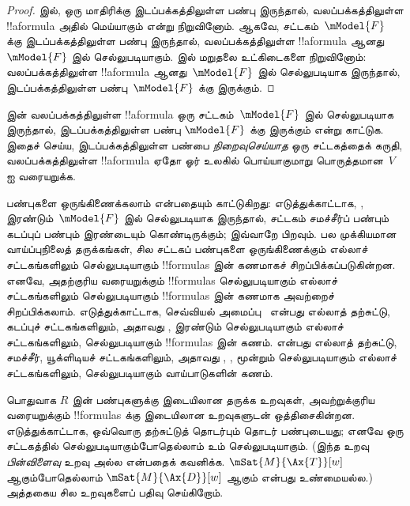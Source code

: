 \documentclass[../../../include/open-logic-section]{subfiles}
\begin{document}
\begin{proof}
   இல், ஒரு மாதிரிக்கு இடப்பக்கத்திலுள்ள பண்பு
  இருந்தால், வலப்பக்கத்திலுள்ள !!a{formula} அதில் மெய்யாகும் என்று
  நிறுவினோம். ஆகவே, சட்டகம்~$\mModel{F}$ க்கு இடப்பக்கத்திலுள்ள பண்பு
  இருந்தால், வலப்பக்கத்திலுள்ள !!a{formula} ஆனது~$\mModel{F}$ இல்
  செல்லுபடியாகும்.  இல் மறுதலை உட்கிடைகளை
  நிறுவினோம்: வலப்பக்கத்திலுள்ள !!a{formula} ஆனது~$\mModel{F}$ இல்
  செல்லுபடியாக இருந்தால், இடப்பக்கத்திலுள்ள பண்பு~$\mModel{F}$ க்கு இருக்கும்.
\end{proof}

\begin{prob}
 இன் வலப்பக்கத்திலுள்ள !!a{formula}
ஒரு சட்டகம்~$\mModel{F}$ இல் செல்லுபடியாக இருந்தால், இடப்பக்கத்திலுள்ள பண்பு
$\mModel{F}$ க்கு இருக்கும் என்று காட்டுக. இதைச் செய்ய, இடப்பக்கத்திலுள்ள
பண்பை \emph{நிறைவுசெய்யாத} ஒரு சட்டகத்தைக் கருதி, வலப்பக்கத்திலுள்ள
!!a{formula} ஏதோ ஓர் உலகில் பொய்யாகுமாறு பொருத்தமான~$V$ ஐ வரையறுக்க.
\end{prob}

பண்புகளை ஒருங்கிணைக்கலாம் என்பதையும் 
காட்டுகிறது: எடுத்துக்காட்டாக, ,  இரண்டும்~$\mModel{F}$ இல்
செல்லுபடியாக இருந்தால், சட்டகம் சமச்சீர்ப் பண்பும் கடப்புப் பண்பும் இரண்டையும்
கொண்டிருக்கும்; இவ்வாறே பிறவும். பல முக்கியமான வாய்ப்புநிலைத் தருக்கங்கள்,
சில சட்டகப் பண்புகளை ஒருங்கிணைக்கும் எல்லாச் சட்டகங்களிலும் செல்லுபடியாகும்
!!{formula}s இன் கணமாகச் சிறப்பிக்கப்படுகின்றன. எனவே, அதற்குரிய வரையறுக்கும்
!!{formula}s செல்லுபடியாகும் எல்லாச் சட்டகங்களிலும் செல்லுபடியாகும்
!!{formula}s இன் கணமாக அவற்றைச் சிறப்பிக்கலாம். எடுத்துக்காட்டாக, செவ்வியல்
அமைப்பு~ என்பது எல்லாத் தற்சுட்டு, கடப்புச் சட்டகங்களிலும்,
அதாவது ,  இரண்டும் செல்லுபடியாகும் எல்லாச் சட்டகங்களிலும்,
செல்லுபடியாகும் !!{formula}s இன் கணம்.  என்பது எல்லாத் தற்சுட்டு,
சமச்சீர், யூக்ளிடியச் சட்டகங்களிலும், அதாவது , , 
மூன்றும் செல்லுபடியாகும் எல்லாச் சட்டகங்களிலும், செல்லுபடியாகும்
வாய்பாடுகளின் கணம்.

பொதுவாக $R$ இன் பண்புகளுக்கு இடையிலான தருக்க உறவுகள், அவற்றுக்குரிய
வரையறுக்கும் !!{formula}s க்கு இடையிலான உறவுகளுடன் ஒத்திசைகின்றன.
எடுத்துக்காட்டாக, ஒவ்வொரு தற்சுட்டுத் தொடர்பும் தொடர் பண்புடையது; எனவே
 ஒரு சட்டகத்தில் செல்லுபடியாகும்போதெல்லாம்  உம் செல்லுபடியாகும்.
(இந்த உறவு \emph{பின்விளைவு} உறவு அல்ல என்பதைக் கவனிக்க. $\mSat{M}{\Ax{T}}[w]$
ஆகும்போதெல்லாம் $\mSat{M}{\Ax{D}}[w]$ ஆகும் என்பது உண்மையல்ல.) அத்தகைய
சில உறவுகளைப் பதிவு செய்கிறோம்.
\end{document}
